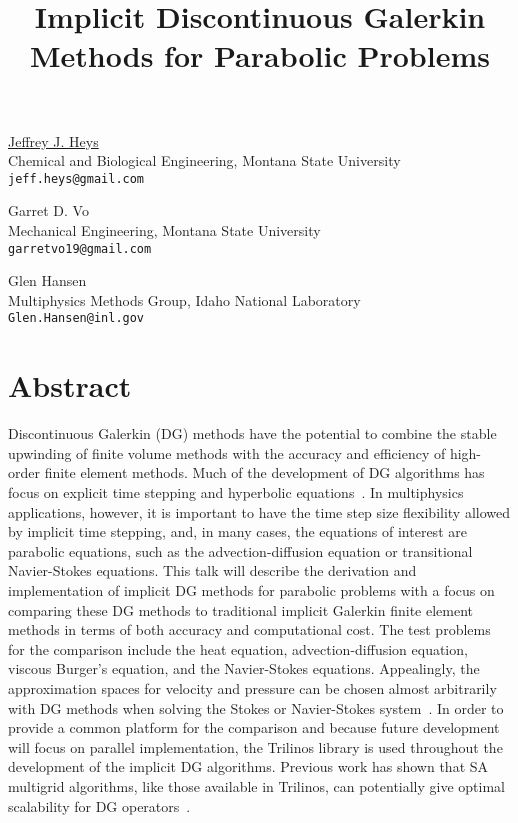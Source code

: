 \title{Implicit Discontinuous Galerkin Methods for Parabolic Problems}
\author{} \institute{}
\maketitle

\begin{center}
{\large \underline{Jeffrey J. Heys}}\\
Chemical and Biological Engineering, Montana State University\\
{\tt jeff.heys@gmail.com}\\
\vspace{4mm}

{\large Garret D. Vo}\\
Mechanical Engineering, Montana State University\\
{\tt garretvo19@gmail.com}\\
\vspace{4mm}

{\large Glen Hansen}\\
Multiphysics Methods Group, Idaho National Laboratory\\
{\tt Glen.Hansen@inl.gov}
\end{center}

\section*{Abstract}
Discontinuous Galerkin (DG) methods have the potential to combine the stable upwinding of finite volume methods with the accuracy and efficiency of high-order finite element methods.  Much of the development of DG algorithms has focus on explicit time stepping and hyperbolic equations~\cite{HesWar2010}.  In multiphysics applications, however, it is important to have the time step size flexibility allowed by implicit time stepping, and, in many cases, the equations of interest are parabolic equations, such as the advection-diffusion equation or transitional Navier-Stokes equations.  This talk will describe the derivation and implementation of implicit DG methods for parabolic problems with a focus on comparing these DG methods to traditional implicit Galerkin finite element methods in terms of both accuracy and computational cost.  The test problems for the comparison include the heat equation, advection-diffusion equation, viscous Burger's equation, and the Navier-Stokes equations.  Appealingly, the approximation spaces for velocity and pressure can be chosen almost arbitrarily with DG methods when solving the Stokes or Navier-Stokes system~\cite{CocKanSch2002}.  In order to provide a common platform for the comparison and because future development will focus on parallel implementation, the Trilinos library is used throughout the development of the implicit DG algorithms.  Previous work has shown that SA multigrid algorithms, like those available in Trilinos, can potentially give optimal scalability for DG operators~\cite{OlsSch2010}.

